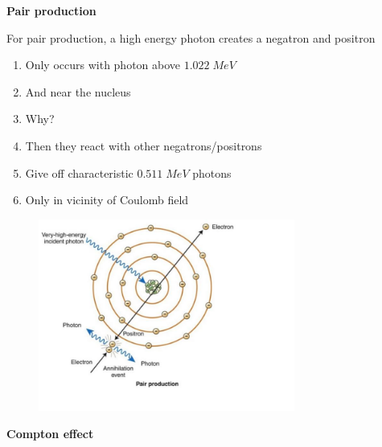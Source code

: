 \documentclass[aspectratio=1610,pdftex,dvipsnames,compress,xcolor={dvipsnames}]{beamer}
\begin{document}
\begin{frame}[plain]{}
    \centering\LARGE\textbf{Pair production}
\end{frame}


\addtocounter{framenumber}{-1} 
\begin{frame}{For pair production, a high energy photon creates a negatron and positron}
    \begin{enumerate}[series=outerlist,topsep=0pt,itemsep=21pt,leftmargin=*,label=(\arabic*)]
        \item[]Only occurs with photon above $1.022 \; MeV$
        \item[]And near the nucleus
        \item[]Why?
        \item[]Then they react with other negatrons/positrons
        \item[]Give off characteristic $0.511 \; MeV$ photons
        \item[]Only in vicinity of Coulomb field
    \end{enumerate}
\end{frame}


\begin{frame}{}
    \begin{figure}
        \centering
        \includegraphics[width=0.75\textwidth]{pp.jpg}
    \end{figure}
\end{frame}


\begin{frame}[plain]{}
    \centering\LARGE\textbf{Compton effect}
\end{frame}
\end{document}
